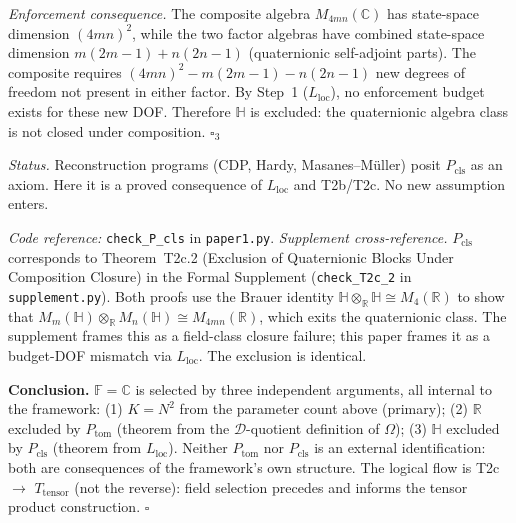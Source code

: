 \documentclass[11pt]{article}
\theoremstyle{remark}
\newcommand{\coderef}[2]{\smallskip\noindent\textit{Code reference:} \texttt{#1} in \texttt{#2}.}
\begin{document}
\begin{tcolorbox}[apfbox, title={$P_{\mathrm{cls}}$: Compositional Closure}]
\textit{Enforcement consequence.}  The composite algebra $M_{4mn}(\mathbb{C})$ has state-space dimension $(4mn)^2$, while the two factor algebras have combined state-space dimension $m(2m-1) + n(2n-1)$ (quaternionic self-adjoint parts).  The composite requires $(4mn)^2 - m(2m-1) - n(2n-1)$ new degrees of freedom not present in either factor.  By Step~1 ($L_{\mathrm{loc}}$), no enforcement budget exists for these new DOF.  Therefore $\mathbb{H}$ is excluded: the quaternionic algebra class is not closed under composition.  \hfill$\square_3$

\smallskip\noindent\textit{Status.}  Reconstruction programs (CDP, Hardy, Masanes--M\"uller) posit $P_{\mathrm{cls}}$ as an axiom.  Here it is a proved consequence of $L_{\mathrm{loc}}$ and T2b/T2c.  No new assumption enters.

\coderef{check\_P\_cls}{paper1.py}
\smallskip\noindent\textit{Supplement cross-reference.}  $P_{\mathrm{cls}}$ corresponds to Theorem~T2c.2 (Exclusion of Quaternionic Blocks Under Composition Closure) in the Formal Supplement (\texttt{check\_T2c\_2} in \texttt{supplement.py}).  Both proofs use the Brauer identity $\mathbb{H} \otimes_\mathbb{R} \mathbb{H} \cong M_4(\mathbb{R})$ to show that $M_m(\mathbb{H}) \otimes_\mathbb{R} M_n(\mathbb{H}) \cong M_{4mn}(\mathbb{R})$, which exits the quaternionic class.  The supplement frames this as a field-class closure failure; this paper frames it as a budget-DOF mismatch via $L_{\mathrm{loc}}$.  The exclusion is identical.
\end{tcolorbox}

\smallskip\noindent\textbf{Conclusion.}  $\mathbb{F} = \mathbb{C}$ is selected by three independent arguments, all internal to the framework: (1) $K = N^2$ from the parameter count above (primary); (2) $\mathbb{R}$ excluded by $P_{\mathrm{tom}}$ (theorem from the $\mathcal{D}$-quotient definition of $\Omega$); (3) $\mathbb{H}$ excluded by $P_{\mathrm{cls}}$ (theorem from $L_{\mathrm{loc}}$).  Neither $P_{\mathrm{tom}}$ nor $P_{\mathrm{cls}}$ is an external identification: both are consequences of the framework's own structure.  The logical flow is T2c $\to$ $T_{\mathrm{tensor}}$ (not the reverse): field selection precedes and informs the tensor product construction.  \hfill$\square$
\end{document}
